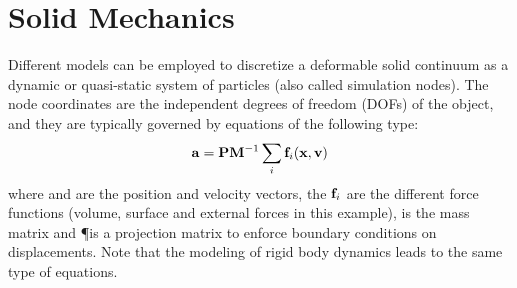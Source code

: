 \section{Solid Mechanics} \label{sec:rigidAndDeformable}


Different models can be employed to discretize a deformable solid continuum as a dynamic or quasi-static system of particles (also called simulation nodes).
The node coordinates are the independent degrees of freedom (DOFs) of the object, and they are typically governed by equations of the following type:
\begin{equation}
 \label{eq:expliciteulerexample}
 \mathbf{a } = \mathbf{{P}} \mathbf{{M}}^{-1} \sum_i \mathbf{f }_i (\mathbf{x },\mathbf{v })
\end{equation}
where \Vx and \Vv are the position and velocity vectors, the $\mathbf{f }_i$ are the different force functions (volume, surface and external forces in this example), \M is the mass matrix and \P is a projection matrix to  enforce boundary conditions on displacements. Note that the modeling of rigid body dynamics leads to the same type of equations.

